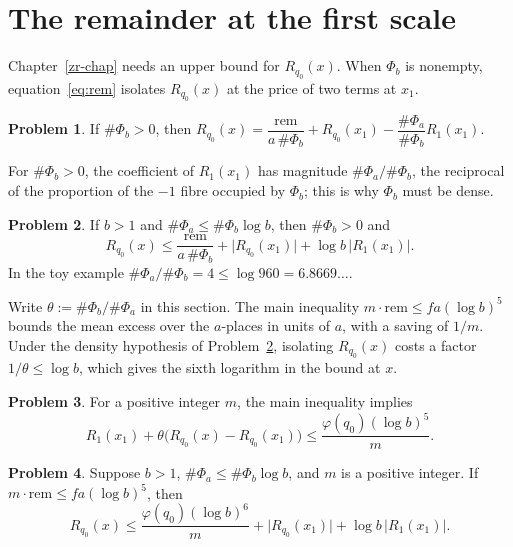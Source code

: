 \documentclass[reqno]{amsart}
\newcounter{chap}
\theoremstyle{definition}
\newtheorem{problem}{Problem}[section]
\theoremstyle{plain}
\newcommand{\rem}{\mathrm{rem}}
\begin{document}
\section{The remainder at the first scale}\label{sec:two-scales}

Chapter~\ref{zr-chap} needs an upper bound for \(R_{q_0}(x)\).  When \(\Phi_b\) is nonempty, equation~\eqref{eq:rem} isolates \(R_{q_0}(x)\) at the price of two terms at \(x_1\).

\begin{problem}\label{pr:solve}
If \(\#\Phi_b > 0\), then \(R_{q_0}(x) = \dfrac{\rem}{a\,\#\Phi_b} + R_{q_0}(x_1) - \dfrac{\#\Phi_a}{\#\Phi_b} R_1(x_1)\).
\end{problem}

For \(\#\Phi_b>0\), the coefficient of \(R_1(x_1)\) has magnitude \(\#\Phi_a/\#\Phi_b\), the reciprocal of the proportion of the \(-1\) fibre occupied by \(\Phi_b\); this is why \(\Phi_b\) must be dense.

\begin{problem}\label{pr:dense}
If \(b > 1\) and \(\#\Phi_a \le \#\Phi_b \log b\), then \(\#\Phi_b > 0\) and
\[
  R_{q_0}(x) \le \frac{\rem}{a\,\#\Phi_b} + \lvert R_{q_0}(x_1) \rvert + \log b \, \lvert R_1(x_1) \rvert .
\]
In the toy example \(\#\Phi_a/\#\Phi_b = 4 \le \log 960 = 6.8669\ldots\).
\end{problem}

Write \(\theta := \#\Phi_b/\#\Phi_a\) in this section.  The main inequality \(m \cdot \rem \le fa(\log b)^5\) bounds the mean excess over the \(a\)-places in units of \(a\), with a saving of \(1/m\).  Under the density hypothesis of Problem~\ref{pr:dense}, isolating \(R_{q_0}(x)\) costs a factor \(1/\theta \le \log b\), which gives the sixth logarithm in the bound at \(x\).

\begin{problem}\label{pr:mean-main}
For a positive integer \(m\), the main inequality implies
\[
  R_1(x_1) + \theta \bigl(R_{q_0}(x) - R_{q_0}(x_1)\bigr)
  \le \frac{\varphi(q_0)(\log b)^5}{m}.
\]
\end{problem}

\begin{problem}\label{pr:with-main}
Suppose \(b > 1\), \(\#\Phi_a \le \#\Phi_b \log b\), and \(m\) is a positive integer.  If \(m \cdot \rem \le f a (\log b)^5\), then
\[
  R_{q_0}(x) \le \frac{\varphi(q_0) (\log b)^6}{m} + \lvert R_{q_0}(x_1) \rvert + \log b \, \lvert R_1(x_1) \rvert .
\]
\end{problem}
\end{document}
